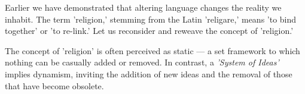 \documentclass[11pt,a4]{article}
\begin{document}
\par
Earlier we have demonstrated that altering language changes the reality we inhabit. The term 'religion,' stemming from the Latin 'religare,' means 'to bind together' or 'to re-link.' Let us reconsider and reweave the concept of 'religion.'

\par
The concept of 'religion' is often perceived as static — a set framework to which nothing can be casually added or removed. In contrast, a \textit{'System of Ideas'} implies dynamism, inviting the addition of new ideas and the removal of those that have become obsolete.





 

 




 


\end{document}
